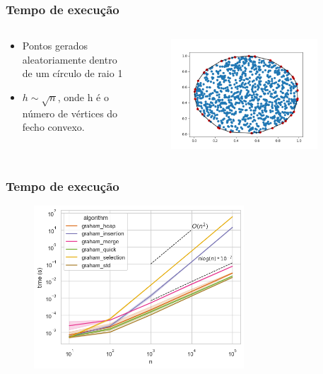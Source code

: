 \documentclass[aspectratio=169,usenames,dvipsnames]{beamer}
\begin{document}
\begin{frame}
\frametitle{Tempo de execução}
\begin{columns}
  \begin{column}{0.4\textwidth}
  \begin{itemize}
    \item Pontos gerados aleatoriamente dentro de um círculo de raio 1
    \item $h \sim \sqrt{n}$, onde h é o número de vértices do fecho convexo.
  \end{itemize}
  \end{column}
  \begin{column}{0.6\textwidth}
    \begin{figure}
      \includegraphics[width=0.9\textwidth]{./figures/random_merge_1000_1.png}
    \end{figure}
  \end{column}
\end{columns}
  
\end{frame}

\begin{frame}
\frametitle{Tempo de execução}
    \begin{figure}
        \includegraphics[width=0.7\textwidth]{./figures/circle_times.png}
    \end{figure}
\end{frame}
\end{document}

